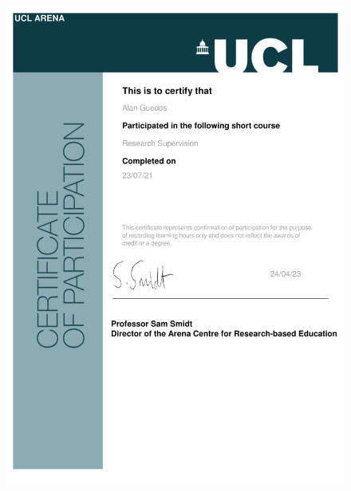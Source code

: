 \documentclass[10pt,a4paper,sans,colorlinks]{moderncv}
\begin{document}
\begin{figure}
    \centering
    \includegraphics[align=t,width=\textwidth,height=0.4\textheight, keepaspectratio=true]{certificates/Research_Supervision.pdf}

\end{figure}
\end{document}
